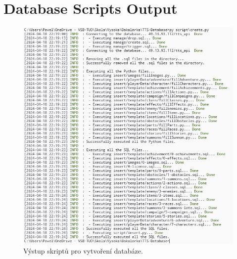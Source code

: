 \chapter{Database Scripts Output}
\label{ch:appendix-database-scripts-output}

\begin{figure}[ht]
    \centering
    \includegraphics[width=1.0\textwidth]{figures/dbScriptsOutput}
    \caption{Výstup skriptů pro vytvoření databáze.}
    \label{fig:databaseScriptsOutput}
\end{figure}

\endinput